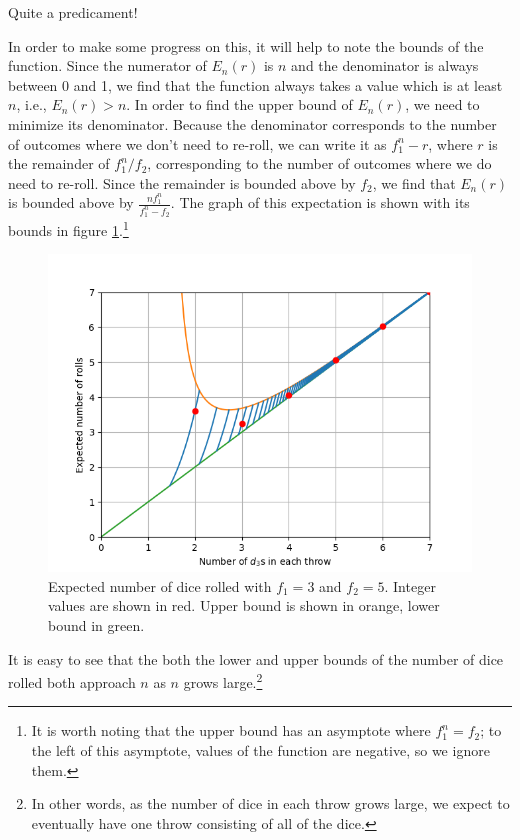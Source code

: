 \documentclass{article}
\begin{document}
Quite a predicament!
\par In order to make some progress on this, it will help to note the bounds of the function.
Since the numerator of $E_n(r)$ is $n$ and the denominator is always between 0 and 1, we find that the function always takes a value which is at least $n$, i.e., $E_n(r) > n$.
In order to find the upper bound of $E_n(r)$, we need to minimize its denominator.
Because the denominator corresponds to the number of outcomes where we don't need to re-roll, we can write it as $f_1^n - r$, where $r$ is the remainder of $f_1^n / f_2$, corresponding to the number of outcomes where we do need to re-roll.
Since the remainder is bounded above by $f_2$, we find that $E_n(r)$ is bounded above by $\frac{nf_1^n}{f_1^n-f_2}$.
The graph of this expectation is shown with its bounds in figure \ref{fig:num-rolls-with-bounds}.\footnote{It is worth noting that the upper bound has an asymptote where $f_1^n=f_2$; to the left of this asymptote, values of the function are negative, so we ignore them.}
\begin{figure}
    \centering
    \includegraphics[scale=0.5]{num-rolls-with-bounds.png}
    \caption{Expected number of dice rolled with $f_1=3$ and $f_2=5$. Integer values are shown in red. Upper bound is shown in orange, lower bound in green.}
    \label{fig:num-rolls-with-bounds}
\end{figure}
\par It is easy to see that the both the lower and upper bounds of the number of dice rolled both approach $n$ as $n$ grows large.\footnote{In other words, as the number of dice in each throw grows large, we expect to eventually have one throw consisting of all of the dice.}
\end{document}
